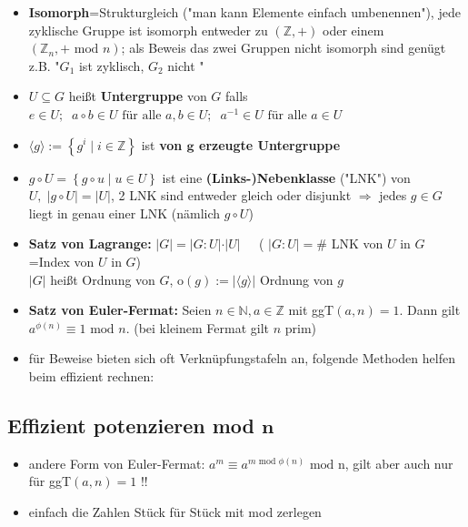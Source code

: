 \documentclass[10pt,a4paper]{article}
\begin{document}
\begin{itemize}
\item \textbf{Isomorph}=Strukturgleich ("man kann Elemente einfach umbenennen"), jede zyklische Gruppe ist isomorph entweder zu $(\mathbb{Z},+)$ oder einem $(\mathbb{Z}_{n},+ \text{ mod } n)$; als Beweis das zwei Gruppen nicht isomorph sind genügt z.B. "$G_{1}$ ist zyklisch, $G_{2}$ nicht "
\item $U\subseteq G$ heißt \textbf{Untergruppe} von $G$ falls $e\in U;\;\; a\circ b \in U \text { für alle } a,b\in U;\;\; a^{-1} \in U \text{ für alle } a \in U$ 
\item $\langle g \rangle:=\left\lbrace g^{i}\mid i \in \mathbb{Z}\right\rbrace$ ist \textbf{von $\boldsymbol{g}$ erzeugte Untergruppe}
\item $g \circ U=\left\lbrace g\circ u \mid u \in U \right\rbrace$ ist eine \textbf{(Links-)Nebenklasse} ("LNK") von $U,\; \vert g\circ U\vert =\vert U\vert$, 2 LNK sind entweder gleich oder disjunkt $\Rightarrow$ jedes $g\in G$ liegt in genau einer LNK (nämlich $g\circ U$)
\item \textbf{Satz von Lagrange:} $\vert G \vert = \vert G : U \vert \cdot \vert U \vert\;\;\;\;$  ( $\vert G : U \vert=\#$ LNK von $U$ in $G$=Index von $U$ in $G$)\\ $\vert G \vert$ heißt Ordnung von $G$, o$(g):=\vert \langle g\rangle \vert$ Ordnung von $g$
\item \textbf{Satz von Euler-Fermat:} Seien $n\in \mathbb{N}, a\in \mathbb{Z}$ mit ggT$(a,n)=1$. Dann gilt $a^{\phi(n)}\equiv 1 \text{ mod } n$. (bei kleinem Fermat gilt $n$ prim)
\item für Beweise bieten sich oft Verknüpfungstafeln an, folgende Methoden helfen beim effizient rechnen:
\end{itemize}



\subsection{Effizient potenzieren mod $\boldsymbol{n}$}
\begin{itemize}


\item andere Form von Euler-Fermat: $a^{m} \equiv a^{m \text { mod } \phi (n)} \text{ mod n}$, gilt aber auch nur für ggT$(a,n)=1$ !!
\item einfach die Zahlen Stück für Stück mit mod zerlegen
\end{itemize}
\end{document}

